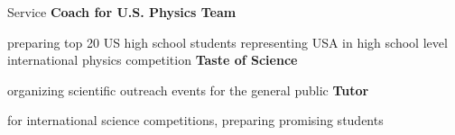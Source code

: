 \begin{rubric}{Service}
%
\entry*[]%
  \textbf{Coach for U.S. Physics Team}
  \par preparing top 20 US high school students representing USA in high school level international physics competition
%
\entry*[]%
  \textbf{Taste of Science} 
  \par organizing scientific outreach events
for the general public
%
\entry*[]%
  \textbf{Tutor}
  \par for international science competitions, preparing promising students
\end{rubric}
